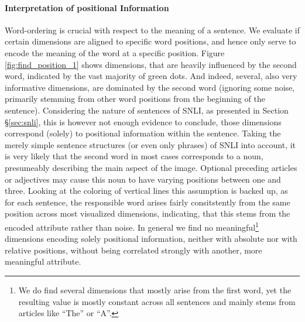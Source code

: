 \paragraph*{Interpretation of positional Information}
Word-ordering is crucial  with respect to the meaning of a sentence. We evaluate if certain dimensions are aligned to specific word positions, and hence only serve to encode the meaning of the word at a specific position. Figure \ref{fig:find_position_1} shows dimensions, that are heavily influenced by the second word, indicated by the vast majority of green dots. And indeed, several, also very informative dimensions, are dominated by the second word (ignoring some noise, primarily stemming from other word positions from the beginning of the sentence). Considering the nature of sentences of \ac{SNLI}, as presented in Section §\ref{sec:snli}, this is however not enough evidence to conclude, those dimensions correspond (solely) to positional information within the sentence. Taking the merely simple sentence structures (or even only phrases) of \ac{SNLI} into account, it is very likely that the second word in most cases corresponds to a noun, presumeably describing the main aspect of the image. Optional preceding articles or adjectives may cause this noun to have varying positions between one and three. Looking at the coloring of vertical lines this assumption is backed up, as for each sentence, the responsible word arises fairly consitstently from the same position across most visualized dimensions, indicating, that this stems from the encoded attribute rather than noise. In general we find no meaningful\footnote{We do find several dimensions that mostly arise from the first word, yet the resulting value is mostly constant across all sentences and mainly stems from articles like ``The'' or ``A''.} dimensions encoding solely positional information, neither with absolute nor with relative positions, without being correlated strongly with another, more meaningful attribute.
